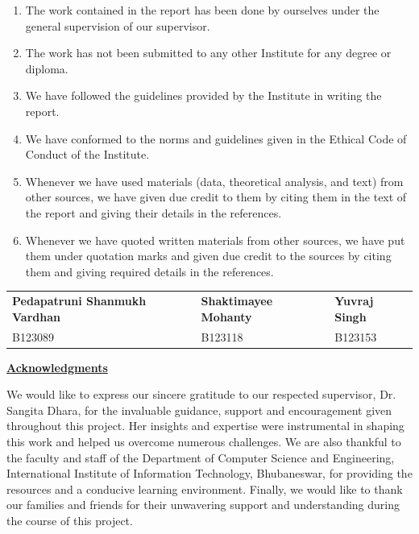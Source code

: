\documentclass[10pt,openany]{report}
\begin{document}
\begin{enumerate}
  \item The work contained in the report has been done by ourselves under the general supervision
        of our supervisor.
  \item The work has not been submitted to any other Institute for any degree or diploma.
  \item We have followed the guidelines provided by the Institute in writing the report.
  \item We have conformed to the norms and guidelines given in the Ethical Code of Conduct of the
        Institute.
  \item Whenever we have used materials (data, theoretical analysis, and text) from other sources,
        we have given due credit to them by citing them in the text of the report and giving their
        details in the references.
  \item Whenever we have quoted written materials from other sources, we have put them under
        quotation marks and given due credit to the sources by citing them and giving required
        details in the references.
\end{enumerate}

\vspace{2.5cm}
\noindent
\noindent
\begin{tabular}{@{}p{5.75cm}p{4.35cm}p{4.35cm}@{}}
\textbf{Pedapatruni Shanmukh Vardhan} & \textbf{Shaktimayee Mohanty} & \textbf{Yuvraj Singh} \\[0.12em]
B123089 & B123118 & B123153 \\
\end{tabular}

\newpage
\thispagestyle{empty}
\noindent\underline{\textbf{Acknowledgments}}

\vspace{0.9cm}
\noindent
We would like to express our sincere gratitude to our respected supervisor, Dr. Sangita Dhara, for the
invaluable guidance, support and encouragement given throughout this project. Her insights and
expertise were instrumental in shaping this work and helped us overcome numerous challenges. We are
also thankful to the faculty and staff of the Department of Computer Science and Engineering,
International Institute of Information Technology, Bhubaneswar, for providing the resources and a
conducive learning environment. Finally, we would like to thank our families and friends for their
unwavering support and understanding during the course of this project.
\end{document}
